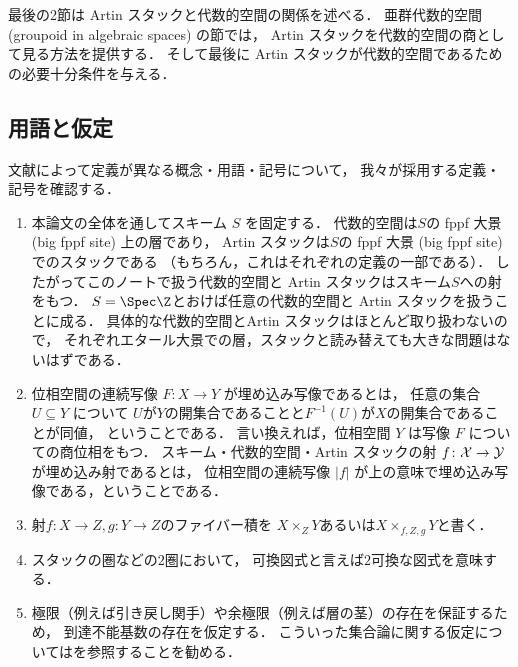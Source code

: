     最後の2節は Artin スタックと代数的空間の関係を述べる．
    亜群代数的空間 (groupoid in algebraic spaces) の節では，
    Artin スタックを代数的空間の商として見る方法を提供する．
    そして最後に Artin スタックが代数的空間であるための必要十分条件を与える．

\subsection{用語と仮定} \label{ssec:term_conv}
    文献によって定義が異なる概念・用語・記号について，
    我々が採用する定義・記号を確認する．
    \begin{enumerate}
        \item
            本論文の全体を通してスキーム $S$ を固定する．
            代数的空間は$S$の fppf 大景 (big fppf site) 上の層であり，
            Artin スタックは$S$の fppf 大景 (big fppf site) でのスタックである
            （もちろん，これはそれぞれの定義の一部である）．
            したがってこのノートで扱う代数的空間と Artin スタックはスキーム$S$への射をもつ．
            $S=\Spec \Z$とおけば任意の代数的空間と Artin スタックを扱うことに成る．
            具体的な代数的空間とArtin スタックはほとんど取り扱わないので，
            それぞれエタール大景での層，スタックと読み替えても大きな問題はないはずである．
        
        \item
            位相空間の連続写像 $F \colon X \to Y$ が埋め込み写像であるとは，
            任意の集合 $U \subseteq Y$ について
            $U$が$Y$の開集合であることと$F^{-1}(U)$が$X$の開集合であることが同値，
            ということである．
            言い換えれば，位相空間 $Y$ は写像 $F$ についての商位相をもつ．
            スキーム・代数的空間・Artin スタックの射 $f \colon \mathcal{X} \to \mathcal{Y}$ が埋め込み射であるとは，
            位相空間の連続写像 $|f|$ が上の意味で埋め込み写像である，ということである．

        \item
            射$f \colon X \to Z, g \colon Y \to Z$のファイバー積を
            $X \times_{Z} Y$あるいは$X \times_{f,Z,g} Y$と書く．

        \item
            スタックの圏などの$2$圏において，
            可換図式と言えば$2$可換な図式を意味する．

        \item
            極限（例えば引き戻し関手）や余極限（例えば層の茎）の存在を保証するため，
            到達不能基数の存在を仮定する．
            こういった集合論に関する仮定については\cite{Shulman08}を参照することを勧める．
    \end{enumerate}
    \newpage

